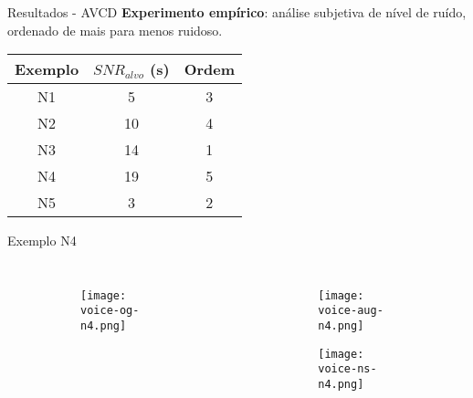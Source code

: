 \begin{frame}{Resultados - AVCD}
    \textbf{Experimento empírico}: análise subjetiva de nível de ruído, ordenado de mais para menos ruidoso.
    \vspace{1cm}
    
    \begin{table} [H]
        \centering
        \begin{tabular}{c|c|c}
    
            \textbf{Exemplo} & 
            \textbf{$SNR_{alvo}$ (s)} & 
            \textbf{Ordem} \\
            \hline 
    
            N1 &  5 & 3 \\
            N2 & 10 & 4 \\
            N3 & 14 & 1 \\
            N4 & 19 & 5 \\
            N5 &  3 & 2 \\
    
        \end{tabular}
    \end{table}
\end{frame}

\begin{frame}{Exemplo N4}
    \begin{columns}
        \begin{figure}
            \begin{subfigure}{\textwidth}
                \centering
                \texttt{[image: voice-og-n4.png]}
            \end{subfigure}
        \end{figure}

        \begin{figure}
            \begin{subfigure}{\textwidth}
                \centering
                \texttt{[image: voice-aug-n4.png]}
            \end{subfigure}
            \begin{subfigure}{\textwidth}
                \centering
                \texttt{[image: voice-ns-n4.png]}
            \end{subfigure}
        \end{figure}
    \end{columns}
\end{frame}

